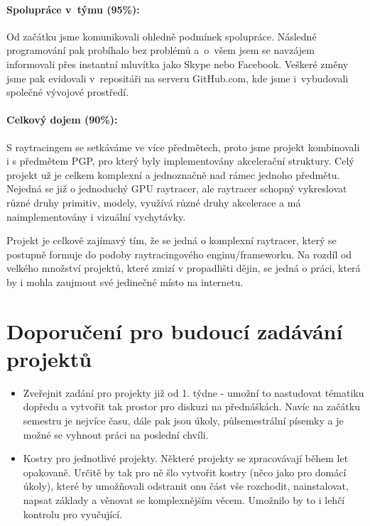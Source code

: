\documentclass[12pt,a4paper,titlepage,final]{report}
\begin{document}
\paragraph{Spolupráce v~týmu (95\%):}
Od začátku jsme komunikovali ohledně podmínek spolupráce. Následné programování pak probíhalo bez problémů a~o~všem jsem se navzájem informovali přes instantní mluvítka jako Skype nebo Facebook. Veškeré změny jsme pak evidovali v~repositáři na serveru GitHub.com, kde jsme i~vybudovali společné vývojové prostředí.

\paragraph{Celkový dojem (90\%):} 

S raytracingem se setkáváme ve více předmětech, proto jsme projekt kombinovali i s předmětem PGP, pro který byly implementovány akcelerační struktury. Celý projekt už je celkem komplexní a jednoznačně nad rámec jednoho předmětu. Nejedná se již o jednoduchý GPU raytracer, ale raytracer schopný vykreslovat různé druhy primitiv, modely, využívá různé druhy akcelerace a má naimplementovány i vizuální vychytávky.

Projekt je celkově zajímavý tím, že se jedná o komplexní raytracer, který se postupně formuje do podoby raytracingového enginu/frameworku. Na rozdíl od velkého množství projektů, které zmizí v propadlišti dějin, se jedná o práci, která by i mohla zaujmout své jedinečné místo na internetu.


\section{Doporučení pro budoucí zadávání projektů}

\begin{itemize}
	\item Zveřejnit zadání pro projekty již od 1. týdne - umožní to nastudovat tématiku dopředu a vytvořit tak prostor pro diskuzi na přednáškách. Navíc na začátku semestru je nejvíce času, dále pak jsou úkoly, půlsemestrální písemky a je možné se vyhnout práci na poslední chvíli.
	\item Kostry pro jednotlivé projekty. Některé projekty se zpracovávají během let opakovaně. Určitě by tak pro ně šlo vytvořit kostry (něco jako pro domácí úkoly), které by umožňovali odstranit onu část vše rozchodit, nainstalovat, napsat základy a věnovat se komplexnějším věcem. Umožnilo by to i lehčí kontrolu pro vyučující.
\end{itemize}




\nocite{pgr-raytracing}
\nocite{aurelius}
\nocite{pgp-optimalizace}
\nocite{cuda-doc}
\nocite{phong-wiki}
\nocite{so-stack}
\nocite{bvh}
\nocite{cmemory}
\nocite{trier}
\nocite{STRACHOTA}
\nocite{HART}
\nocite{COOK}
\nocite{STOCHASTIC}
\nocite{FUSSELL}




\end{document}
